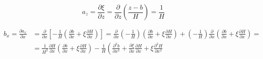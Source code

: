 \begin{equation*}
    a_{z}
    =
    \frac
        {\partial \xi}
        {\partial z}
    =
    \frac
        {\partial}
        {\partial z}
    \left(
        \frac
            {z-b}
            {H}
    \right)
    =
    \frac
        {1}
        {H}
\end{equation*}

\begin{equation*}
    \begin{split}
        b_{x}
        =
        \frac
            {\partial a_{x}}
            {\partial x}
        &
        =
        \frac
            {\partial}
            {\partial x}
        \left[
            -
            \frac
                {1}
                {H}
            \left(
                \frac
                    {\partial b}
                    {\partial x}
                +
                \xi
                \frac
                    {\partial H}
                    {\partial x}
            \right)
        \right]
        =
        \frac
            {\partial}
            {\partial x}
        \left(
            -
            \frac
                {1}
                {H}
        \right)
        \left(
            \frac
                {\partial b}
                {\partial x}
            +
            \xi
            \frac
                {\partial H}
                {\partial x}
        \right)
        +
        \left(
            -
            \frac
                {1}
                {H}
        \right)
        \frac
            {\partial}
            {\partial x}
        \left(
            \frac
                {\partial b}
                {\partial x}
            +
            \xi
            \frac
                {\partial H}
                {\partial x}
        \right)
        =
        \\ &
        =
        \frac
            {1}
            {H^2}
        \frac
            {\partial H}
            {\partial x}
        \left(
            \frac
                {\partial b}
                {\partial x}
            +
            \xi
            \frac
                {\partial H}
                {\partial x}
        \right)
        -
        \frac
            {1}
            {H}
        \left(
            \frac
                {\partial^2 b}
                {\partial x^2}
            +
            \frac
                {\partial \xi}
                {\partial x}
            \frac
                {\partial H}
                {\partial x}
            +\xi
            \frac
                {\partial^2 H}
                {\partial x^2}

\end{split}
\end{equation*}
